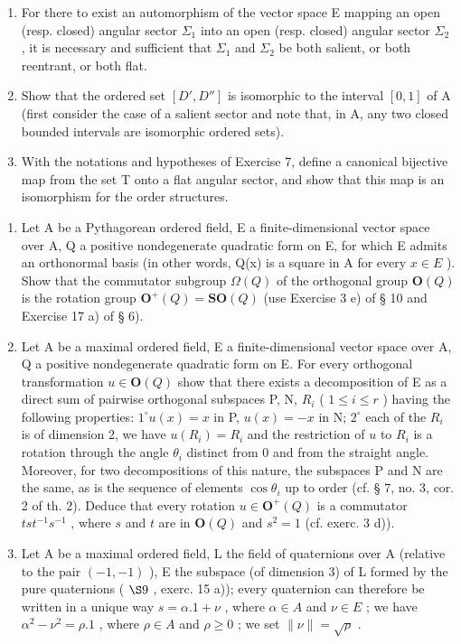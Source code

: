 \begin{enumerate}
\def\labelenumi{\alph{enumi})}
\item
  For there to exist an automorphism of the vector space E mapping an open (resp. closed) angular sector \(\Sigma_{1}\) into an open (resp. closed) angular sector \(\Sigma_{2}\) , it is necessary and sufficient that \(\Sigma_{1}\) and \(\Sigma_{2}\) be both salient, or both reentrant, or both flat.
\item
  Show that the ordered set \(\left[D', D''\right]\) is isomorphic to the interval \(\left[0,1\right]\) of A (first consider the case of a salient sector and note that, in A, any two closed bounded intervals are isomorphic ordered sets).
\item
  With the notations and hypotheses of Exercise 7, define a canonical bijective map from the set T onto a flat angular sector, and show that this map is an isomorphism for the order structures.
\end{enumerate}

\begin{enumerate}
\def\labelenumi{\arabic{enumi})}
\setcounter{enumi}{8}
\item
  Let A be a Pythagorean ordered field, E a finite-dimensional vector space over A, Q a positive nondegenerate quadratic form on E, for which E admits an orthonormal basis (in other words, Q(x) is a square in A for every \(x \in E\) ). Show that the commutator subgroup \(\Omega(Q)\) of the orthogonal group \(\mathbf{O}(Q)\) is the rotation group \(\mathbf{O}^{+}(Q) = \mathbf{S}\mathbf{O}(Q)\) (use Exercise 3 e) of § 10 and Exercise 17 a) of § 6).
\item
  Let A be a maximal ordered field, E a finite-dimensional vector space over A, Q a positive nondegenerate quadratic form on E. For every orthogonal transformation \(u \in \mathbf{O}(Q)\) show that there exists a decomposition of E as a direct sum of pairwise orthogonal subspaces P, N, \(R_i\) ( \(1 \leqslant i \leqslant r\) ) having the following properties: \(1^\circ u(x) = x\) in P, \(u(x) = -x\) in N; \(2^\circ\) each of the \(R_i\) is of dimension 2, we have \(u(R_i) = R_i\) and the restriction of \(u\) to \(R_i\) is a rotation through the angle \(\theta_i\) distinct from 0 and from the straight angle. Moreover, for two decompositions of this nature, the subspaces P and N are the same, as is the sequence of elements \(\cos \theta_i\) up to order (cf. § 7, no. 3, cor. 2 of th. 2). Deduce that every rotation \(u \in \mathbf{O}^+(Q)\) is a commutator \(tst^{-1}s^{-1}\) , where \(s\) and \(t\) are in \(\mathbf{O}(Q)\) and \(s^2 = 1\) (cf. exerc. 3 d)).
\item
  Let A be a maximal ordered field, L the field of quaternions over A (relative to the pair \((-1,-1)\) ), E the subspace (of dimension 3) of L formed by the pure quaternions ( \(\S 9\) , exerc. 15 a)); every quaternion can therefore be written in a unique way \(s=\alpha.1+\nu\) , where \(\alpha\in A\) and \(\nu\in E\) ; we have \(\alpha^{2}-\nu^{2}=\rho.1\) , where \(\rho\in A\) and \(\rho\geqslant0\) ; we set \(\|\nu\|=\sqrt{\rho}\) .
\end{enumerate}

